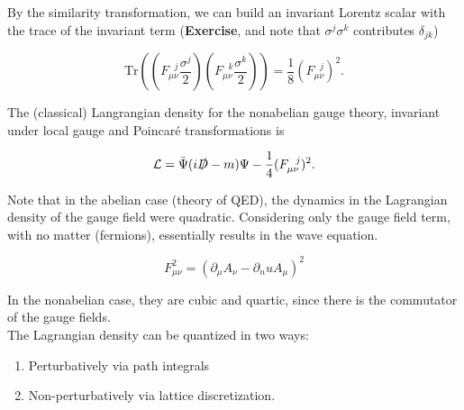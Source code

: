 \noindent By the similarity transformation, we can build an invariant Lorentz scalar with the trace of the invariant term (\textbf{Exercise}, and note that $\sigma^j \sigma^k$ contributes $\delta_{jk}$)

\begin{equation}
\text{Tr}\left( \left( F_{\mu\nu}^{\,\,\,\,j} \frac{\sigma^j}{2} \right)\left( F_{\mu\nu}^{\,\,\,\,k} \frac{\sigma^k}{2} \right) \right)= \frac{1}{8} (F_{\mu\nu}^{\,\,\,\,j})^2.
\end{equation}

\noindent The (classical) Langrangian density for the nonabelian gauge theory, invariant under local gauge and Poincar\'e transformations is

\begin{equation}
\mathcal{L} = \bar{\Psi} (i \slashed{D} - m) \Psi - \frac{1}{4} (F_{\mu\nu}^{\,\,\,\,j})^2.
\end{equation}

\noindent Note that in the abelian case (theory of QED), the dynamics in the Lagrangian density of the gauge field were quadratic. Considering only the gauge field term, with no matter (fermions), essentially results in the wave equation. 

\begin{equation}
F_{\mu\nu}^2 = (\partial_\mu A_\nu - \partial_nu A_\mu)^2
\end{equation}

\noindent In the nonabelian case, they are cubic and quartic, since there is the commutator of the gauge fields. \\

\noindent The Lagrangian density can be quantized in two ways:

\begin{enumerate}
\item Perturbatively via path integrals
\item Non-perturbatively via lattice discretization.
\end{enumerate}


